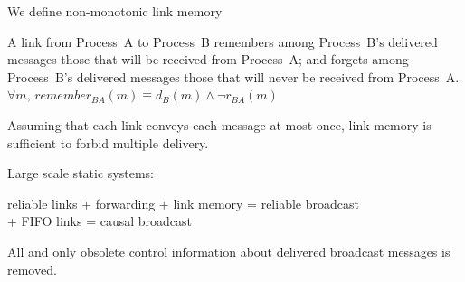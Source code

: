 \documentclass[10pt, xcolor={usenames, dvipsnames}]{beamer}
\newcommand{\cmark}{\ding{51}}
\newcommand{\YES}[1]{\textcolor{green}{#1}}
\begin{document}
\begin{frame}{We define non-monotonic link memory}

  \begin{definition}
    A link from Process~A to Process~B remembers among Process~B's delivered
    messages those that will be received from Process~A; and forgets among
    Process~B's delivered messages those that will never be received from
    Process~A.
    $\forall m,\, remember_{BA}(m) \equiv d_B(m) \wedge \neg r_{BA}(m)$
  \end{definition}

  \vspace{2em}

  \begin{theorem}
    Assuming that each link conveys each message at most once, link memory is
    sufficient to forbid multiple delivery.
  \end{theorem}

\end{frame}


\begin{frame}{Large scale static systems: \YES{\cmark}}
  
  reliable links + forwarding + link memory = reliable broadcast\\
  + FIFO links = causal broadcast


  \begin{minipage}{0.24\textwidth}
    \centering
        
  \end{minipage}
  \begin{minipage}{0.24\textwidth}
    \vspace{11pt}
    \centering
        
  \end{minipage}
  \begin{minipage}{0.24\textwidth}
    \vspace{11pt}
    \centering
        
  \end{minipage}
  \begin{minipage}{0.24\textwidth}
    \vspace{1pt}
    \centering
    
  \end{minipage}

  \vspace{2em}

  All and only obsolete control information about delivered broadcast messages
  is removed.

\end{frame}
\end{document}
